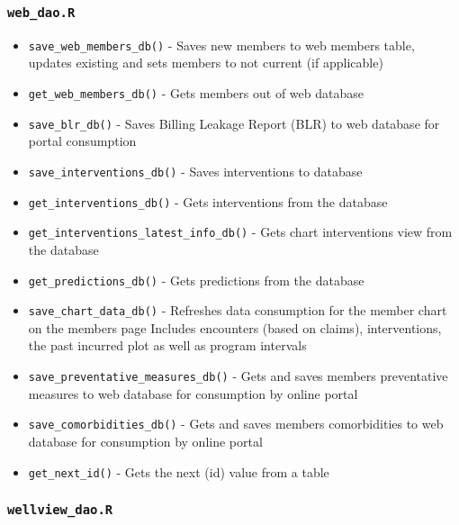 \documentclass[
]{book}
\providecommand{\tightlist}{%
  \setlength{\itemsep}{0pt}\setlength{\parskip}{0pt}}
\begin{document}
\hypertarget{web_dao.r}{%
\subsubsection{\texorpdfstring{\texttt{web\_dao.R}}{web\_dao.R}}\label{web_dao.r}}

\begin{itemize}
\tightlist
\item
  \texttt{save\_web\_members\_db()} - Saves new members to web members table, updates existing and sets members to not current (if applicable)
\item
  \texttt{get\_web\_members\_db()} - Gets members out of web database
\item
  \texttt{save\_blr\_db()} - Saves Billing Leakage Report (BLR) to web database for portal consumption
\item
  \texttt{save\_interventions\_db()} - Saves interventions to database
\item
  \texttt{get\_interventions\_db()} - Gets interventions from the database
\item
  \texttt{get\_interventions\_latest\_info\_db()} - Gets chart interventions view from the database
\item
  \texttt{get\_predictions\_db()} - Gets predictions from the database
\item
  \texttt{save\_chart\_data\_db()} - Refreshes data consumption for the member chart on the members page Includes encounters (based on claims), interventions, the past incurred plot as well as program intervals
\item
  \texttt{save\_preventative\_measures\_db()} - Gets and saves members preventative measures to web database for consumption by online portal
\item
  \texttt{save\_comorbidities\_db()} - Gets and saves members comorbidities to web database for consumption by online portal
\item
  \texttt{get\_next\_id()} - Gets the next (id) value from a table
\end{itemize}

\hypertarget{wellview_dao.r}{%
\subsubsection{\texorpdfstring{\texttt{wellview\_dao.R}}{wellview\_dao.R}}\label{wellview_dao.r}}
\end{document}

